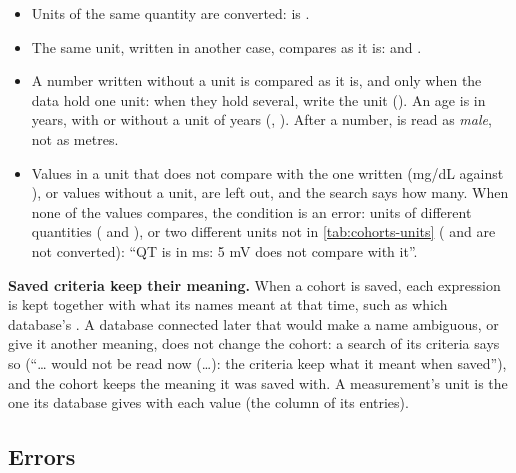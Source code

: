 \begin{itemize}
\item Units of the same quantity are converted:  is .
\item The same unit, written in another case, compares as it is:  and
  .
\item A number written without a unit is compared as it is, and only when the data hold one
  unit: when they hold several, write the unit (). An age is in
  years, with or without a unit of years (, ). After a
  number,  is read as \emph{male}, not as metres.
\item Values in a unit that does not compare with the one written (mg/dL against
  ), or values without a unit, are left out, and the search says how
  many. When none of the values compares, the condition is an error: units of different
  quantities ( and ), or two different units not in \cref{tab:cohorts-units}
  ( and  are not converted): ``QT is in ms: 5 mV does not compare with
  it''.
\end{itemize}
\textbf{Saved criteria keep their meaning.} When a cohort is saved, each expression is kept
together with what its names meant at that time, such as which database's . A database
connected later that would make a name ambiguous, or give it another meaning, does not change
the cohort: a search of its criteria says so (``\dots{} would not be read now (\dots): the
criteria keep what it meant when saved''), and the cohort keeps the meaning it was saved with.
A measurement's unit is the one its database gives with each value (the  column of
its entries).

\subsection{Errors}
\label{sec:cohorts-errors}

